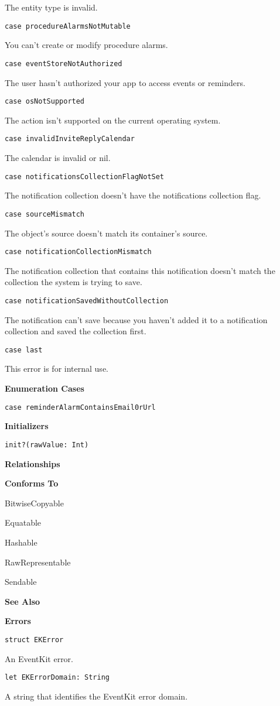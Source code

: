 \documentclass{article}
\begin{document}
The entity type is invalid.

\texttt{case procedureAlarmsNotMutable}

You can't create or modify procedure alarms.

\texttt{case eventStoreNotAuthorized}

The user hasn't authorized your app to access events or reminders.

\texttt{case osNotSupported}

The action isn't supported on the current operating system.

\texttt{case invalidInviteReplyCalendar}

The calendar is invalid or nil.

\texttt{case notificationsCollectionFlagNotSet}

The notification collection doesn't have the notifications collection flag.

\texttt{case sourceMismatch}

The object's source doesn't match its container's source.

\texttt{case notificationCollectionMismatch}

The notification collection that contains this notification doesn't match the collection the system is trying to save.

\texttt{case notificationSavedWithoutCollection}

The notification can't save because you haven't added it to a notification collection and saved the collection first.

\texttt{case last}

This error is for internal use.

\textbf{Enumeration Cases}

\texttt{case reminderAlarmContainsEmail0rUrl}

\textbf{Initializers}

\texttt{init?(rawValue: Int)}

\textbf{Relationships}

\textbf{Conforms To}

BitwiseCopyable

Equatable

Hashable

RawRepresentable

Sendable

\textbf{See Also}

\textbf{Errors}

\texttt{struct EKError}

An EventKit error.

\texttt{let EKErrorDomain: String}

A string that identifies the EventKit error domain.

\newpage
\end{document}
